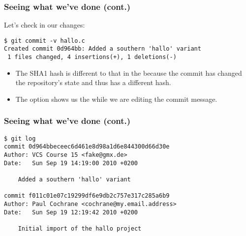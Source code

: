 \begin{frame}[fragile]
\frametitle{Seeing what we've done (cont.)}

Let's check in our changes:
\begin{lstlisting}[basicstyle=\tiny\ttfamily\color{black}]
$ git commit -v hallo.c
Created commit 0d964bb: Added a southern 'hallo' variant
 1 files changed, 4 insertions(+), 1 deletions(-)
\end{lstlisting}
\begin{itemize}
    \item The SHA1 hash is different to that in the  because
	the commit has changed the repository's state and thus has
	a different hash.
    \item The  option shows us the  while we are
	editing the commit message.
\end{itemize}
\end{frame}

\begin{frame}[fragile]
\frametitle{Seeing what we've done (cont.)}
\begin{lstlisting}[basicstyle=\tiny\ttfamily\color{black}]
$ git log
commit 0d964bbeceec6d461e8d98a1d6e844300d66d30e
Author: VCS Course 15 <fake@gmx.de>
Date:   Sun Sep 19 14:19:00 2010 +0200

    Added a southern 'hallo' variant

commit f011c01e07c19299df6e9db2c757e317c285a6b9
Author: Paul Cochrane <cochrane@my.email.address>
Date:   Sun Sep 19 12:19:42 2010 +0200

    Initial import of the hallo project
\end{lstlisting}

\end{frame}

